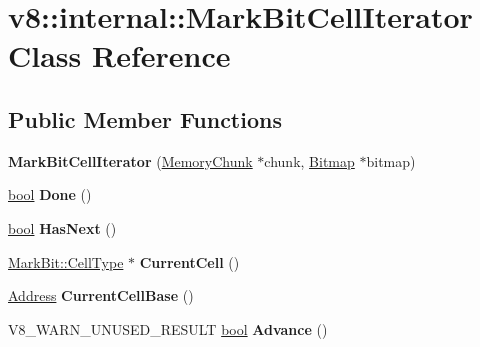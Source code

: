 \hypertarget{classv8_1_1internal_1_1MarkBitCellIterator}{}\section{v8\+:\+:internal\+:\+:Mark\+Bit\+Cell\+Iterator Class Reference}
\label{classv8_1_1internal_1_1MarkBitCellIterator}
\subsection*{Public Member Functions}
\begin{DoxyCompactItemize}
\item 
\mbox{\label{classv8_1_1internal_1_1MarkBitCellIterator_a5fde9b935b23f91c7323429a852bc407}} 
{\bfseries Mark\+Bit\+Cell\+Iterator} (\mbox{\hyperlink{classv8_1_1internal_1_1MemoryChunk}{Memory\+Chunk}} $\ast$chunk, \mbox{\hyperlink{classv8_1_1internal_1_1Bitmap}{Bitmap}} $\ast$bitmap)
\item 
\mbox{\label{classv8_1_1internal_1_1MarkBitCellIterator_a892d05b19076060ae04a140edd737a26}} 
\mbox{\hyperlink{classbool}{bool}} {\bfseries Done} ()
\item 
\mbox{\label{classv8_1_1internal_1_1MarkBitCellIterator_af508159f52dd74b08b8fa52c8085c616}} 
\mbox{\hyperlink{classbool}{bool}} {\bfseries Has\+Next} ()
\item 
\mbox{\label{classv8_1_1internal_1_1MarkBitCellIterator_a7cd15e4ac37293a2acd5c7b42b5dab4b}} 
\mbox{\hyperlink{classuint32__t}{Mark\+Bit\+::\+Cell\+Type}} $\ast$ {\bfseries Current\+Cell} ()
\item 
\mbox{\label{classv8_1_1internal_1_1MarkBitCellIterator_a50370c25ca0b152ca7e36d0b472b06a4}} 
\mbox{\hyperlink{classuintptr__t}{Address}} {\bfseries Current\+Cell\+Base} ()
\item 
\mbox{\label{classv8_1_1internal_1_1MarkBitCellIterator_a24ff9acb9ba90662ce1c36aa874a0eb2}} 
V8\+\_\+\+W\+A\+R\+N\+\_\+\+U\+N\+U\+S\+E\+D\+\_\+\+R\+E\+S\+U\+LT \mbox{\hyperlink{classbool}{bool}} {\bfseries Advance} ()

\end{DoxyCompactItemize}
